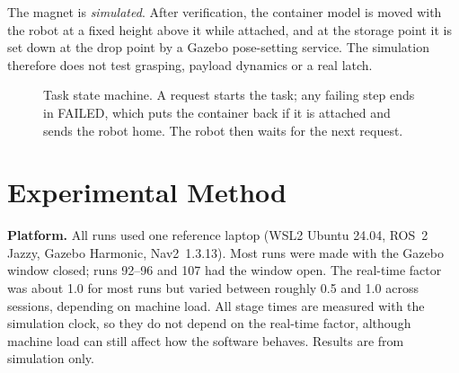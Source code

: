 \documentclass[conference]{IEEEtran}
\begin{document}
The magnet is \emph{simulated}. After verification, the container model is moved with the robot at a fixed height above it while attached, and at the storage point it is set down at the drop point by a Gazebo pose-setting service. The simulation therefore does not test grasping, payload dynamics or a real latch.

\begin{figure}[t]
\centering
{}
\caption{Task state machine. A request starts the task; any failing step ends in FAILED, which puts the container back if it is attached and sends the robot home. The robot then waits for the next request.}
\label{fig:states}
\end{figure}

\section{Experimental Method}\label{sec:method}
\textbf{Platform.} All runs used one reference laptop (WSL2 Ubuntu 24.04, ROS~2 Jazzy, Gazebo Harmonic, Nav2~1.3.13). Most runs were made with the Gazebo window closed; runs 92--96 and 107 had the window open. The real-time factor was about 1.0 for most runs but varied between roughly 0.5 and 1.0 across sessions, depending on machine load. All stage times are measured with the simulation clock, so they do not depend on the real-time factor, although machine load can still affect how the software behaves. Results are from simulation only.
\end{document}
